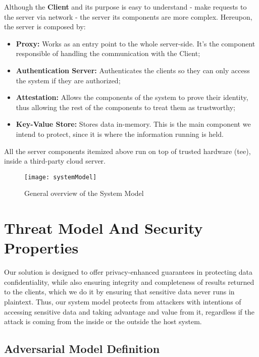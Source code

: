 Although the \textbf{Client} and its purpose is easy to understand - make requests to the server via network - the server its components are more complex. Hereupon, the server is composed by: 
\begin{itemize}
	\item \textbf{Proxy:} Works as an entry point to the whole server-side. It's the component responsible of handling the communication with the Client;
	\item \textbf{Authentication Server:} Authenticates the clients so they can only access the system if they are authorized;
	\item \textbf{Attestation:} Allows the components of the system to prove their identity, thus allowing the rest of the components to treat them as trustworthy;
	\item \textbf{Key-Value Store:} Stores data in-memory. This is the main component we intend to protect, since it is where the information running is held.
\end{itemize} 


All the server components itemized above run on top of trusted hardware (\gls{tee}), inside a third-party cloud server.

\vspace{5mm}
\begin{figure}[htbp]
	\centering
	{\texttt{[image: systemModel]}}
	\caption{General overview of the System Model}
	\label{fig:systemModel}
\end{figure}


\section{Threat Model And Security Properties} %
\label{sec:threatModel_and_securityProperties}

Our solution is designed to offer privacy-enhanced guarantees in protecting data confidentiality, while also ensuring integrity and completeness of results returned to the clients, which we do it by ensuring that sensitive data never runs in plaintext. 
Thus, our system model protects from attackers with intentions of accessing sensitive data and taking advantage and value from it, regardless if the attack is coming from the inside or the outside the host system.


\subsection{Adversarial Model Definition}

